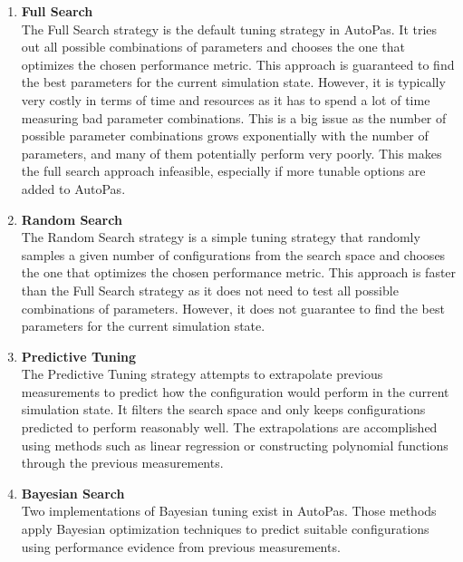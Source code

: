 \begin{enumerate}
      \item \textbf{Full Search} \\
            The Full Search strategy is the default tuning strategy in AutoPas. It tries out all possible combinations of parameters and chooses the one that optimizes the chosen performance metric. This approach is guaranteed to find the best parameters for the current simulation state. However, it is typically very costly in terms of time and resources as it has to spend a lot of time measuring bad parameter combinations. This is a big issue as the number of possible parameter combinations grows exponentially with the number of parameters, and many of them potentially perform very poorly. This makes the full search approach infeasible, especially if more tunable options are added to AutoPas.

      \item \textbf{Random Search} \\
            The Random Search strategy is a simple tuning strategy that randomly samples a given number of configurations from the search space and chooses the one that optimizes the chosen performance metric. This approach is faster than the Full Search strategy as it does not need to test all possible combinations of parameters. However, it does not guarantee to find the best parameters for the current simulation state.

      \item \textbf{Predictive Tuning} \\
            The Predictive Tuning strategy attempts to extrapolate previous measurements to predict how the configuration would perform in the current simulation state. It filters the search space and only keeps configurations predicted to perform reasonably well. The extrapolations are accomplished using methods such as linear regression or constructing polynomial functions through the previous measurements.

      \item \textbf{Bayesian Search} \\
            Two implementations of Bayesian tuning exist in AutoPas. Those methods apply Bayesian optimization techniques to predict suitable configurations using performance evidence from previous measurements.


\end{enumerate}
